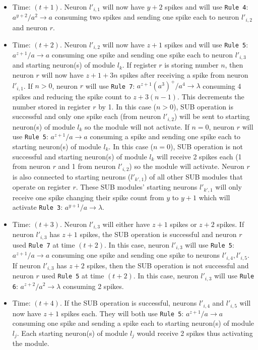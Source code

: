 \documentclass[smallextended]{svjour3}
\begin{document}
\begin{itemize}
   \item Time: $(t+1)$. Neuron $l'_{i,1}$ will now have $y+2$ spikes and will use \texttt{Rule 4}: $a^{y+2}/a^2 \rightarrow a$ consuming two spikes
                        and sending one spike each to neuron $l'_{i,2}$ and neuron $r$.
   \item Time: $(t+2)$. Neuron $l'_{i,2}$ will now have $z+1$ spikes and will use \texttt{Rule 5}: $a^{z+1}/a \rightarrow a$ consuming one spike and
                        sending one spike each to neuron $l'_{i,3}$ and starting neuron(s) of module $l_k$. If register $r$ is storing number $n$,
                        then neuron $r$ will now have $z+1+3n$ spikes after receiving a spike from neuron $l'_{i,1}$. If $n>0$, neuron $r$ will use 
                        \texttt{Rule 7}: $a^{z+1}(a^3)^+/a^4 \rightarrow \lambda$ consuming 4 spikes and reducing the spike count to $z+3(n-1)$. This
                        decrements the number stored in register $r$ by 1. In this case ($n>0$), SUB operation is successful and only one spike each
                        (from neuron $l'_{i,2}$) will be sent to starting neuron(s) of module $l_k$ so the module will not activate. If $n=0$, neuron
                        $r$ will use \texttt{Rule 5}: $a^{z+1}/a \rightarrow a$ consuming a spike and sending one spike each to starting neuron(s) of
                        module $l_k$. In this case ($n=0$), SUB operation is not successful and starting neuron(s) of module $l_k$ will receive 2 
                        spikes each (1 from neuron $r$ and 1 from neuron $l'_{i,2}$) so the module will activate. Neuron $r$ is also connected to 
                        starting neurons ($l'_{k',1}$) of all other SUB modules that operate on register $r$. These SUB modules' starting neurons
                        $l'_{k',1}$ will only receive one spike changing their spike count from $y$ to $y+1$ which will activate \texttt{Rule 3}:
                        $a^{y+1}/a \rightarrow \lambda$.
   \item Time: $(t+3)$. Neuron $l'_{i,3}$ will either have $z+1$ spikes or $z+2$ spikes. If neuron $l'_{i,3}$ has $z+1$ spikes, the SUB operation is
                        successful and neuron $r$ used \texttt{Rule 7} at time $(t+2)$. In this case, neuron $l'_{i,3}$ will use \texttt{Rule 5}: 
                        $a^{z+1}/a  \rightarrow a$ consuming one spike and sending one spike to neurons $l'_{i,4}, l'_{i,5}$. If neuron $l'_{i,3}$
                        has $z+2$ spikes, then the SUB operation is not successful and neuron $r$ used \texttt{Rule 5} at time $(t+2)$. In this case,
                        neuron $l'_{i,3}$ will use \texttt{Rule 6}: $a^{z+2}/a^2 \rightarrow \lambda$ consuming 2 spikes.
   \item Time: $(t+4)$. If the SUB operation is successful, neurons $l'_{i,4}$ and $l'_{i,5}$ will now have $z+1$ spikes each. They will both use 
                        \texttt{Rule 5}: $a^{z+1}/a  \rightarrow a$ consuming one spike and sending a spike each to starting neuron(s) of module 
                        $l_j$. Each starting neuron(s) of module $l_j$ would receive 2 spikes thus activating the module.
\end{itemize}
\end{document}
